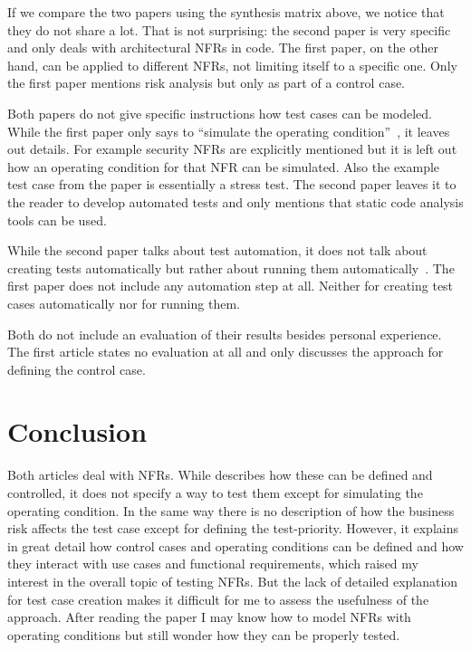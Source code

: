 If we compare the two papers using the synthesis matrix above, we notice that they do not share a lot.
That is not surprising: the second paper is very specific and only deals with architectural \glspl{NFR} in code.
The first paper, on the other hand, can be applied to different \glspl{NFR}, not limiting itself to a specific one.
Only the first paper mentions risk analysis but only as part of a control case.

Both papers do not give specific instructions how test cases can be modeled.
While the first paper only says to \enquote{simulate the operating condition}~\cite{ZouPavlovski2008}, it leaves out details.
For example security \glspl{NFR} are explicitly mentioned but it is left out how an operating condition for that \gls{NFR} can be simulated.
Also the example test case from the paper is essentially a stress test.
The second paper leaves it to the reader to develop automated tests and only mentions that static code analysis tools can be used.

While the second paper talks about test automation, it does not talk about creating tests automatically but rather about running them automatically~\citealp{Lagerstedt2014}.
The first paper does not include any automation step at all.
Neither for creating test cases automatically nor for running them.

Both do not include an evaluation of their results besides personal experience.
The first article states no evaluation at all and only discusses the approach for defining the control case.



\section{Conclusion} \label{sec:9_conclusion}

Both articles deal with \glspl{NFR}.
While \cite{ZouPavlovski2008} describes how these can be defined and controlled, it does not specify a way to test them except for simulating the operating condition.
In the same way there is no description of how the business risk affects the test case except for defining the test-priority.
However, it explains in great detail how control cases and operating conditions can be defined and how they interact with use cases and functional requirements, which raised my interest in the overall topic of testing \glspl{NFR}.
But the lack of detailed explanation for test case creation makes it difficult for me to assess the usefulness of the approach. After reading the paper I may know how to model \glspl{NFR} with operating conditions but still wonder how they can be properly tested.

